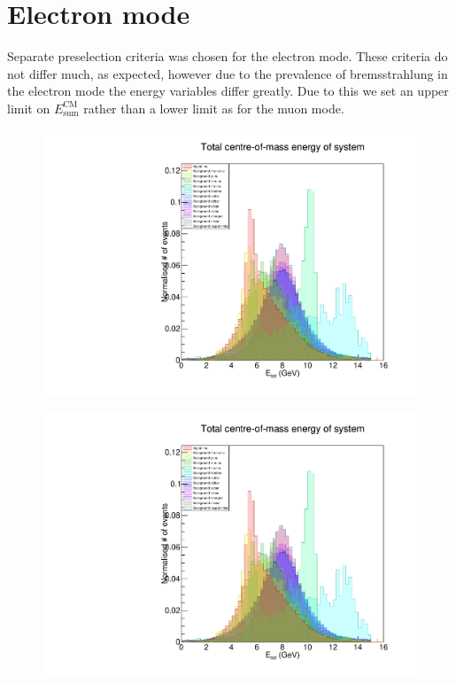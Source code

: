 \documentclass[12pt]{thesis}  %
\begin{document}
\section{Electron mode}

Separate preselection criteria was chosen for the electron mode. These criteria do not differ much, as expected, however due to the prevalence of bremsstrahlung in the electron mode the energy variables differ greatly. Due to this we set an upper limit on $E^{\text{CM}}_{\text{sum}}$ rather than a lower limit as for the muon mode.

\begin{figure}[h]
\centering
\begin{minipage}{.5\textwidth}
  \centering
  \includegraphics[width=\linewidth]{images/stack/stack_cut6_totalCM_E.pdf}
  \label{fig:test1}
\end{minipage}%
\begin{minipage}{.5\textwidth}
  \centering
  \includegraphics[width=\linewidth]{images/stack/stack_cut6_totalCM_E.pdf}
  \label{fig:test2}
\end{minipage}
\end{figure}
\end{document}
